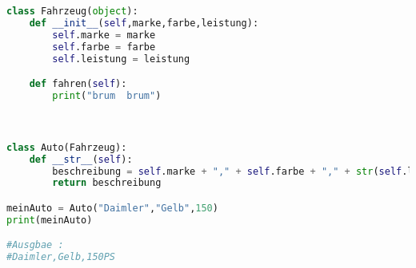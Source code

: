 \begin{lstlisting}[caption= \_\_str\_\_ Ueberschrieben, label=lst:UeberschreibenStr,language=Python]
class Fahrzeug(object):
    def __init__(self,marke,farbe,leistung):
        self.marke = marke
        self.farbe = farbe
        self.leistung = leistung

    def fahren(self):
        print("brum  brum")



class Auto(Fahrzeug):
    def __str__(self):
        beschreibung = self.marke + "," + self.farbe + "," + str(self.leistung) + "PS"
        return beschreibung

meinAuto = Auto("Daimler","Gelb",150)
print(meinAuto)

#Ausgbae :
#Daimler,Gelb,150PS
\end{lstlisting}



